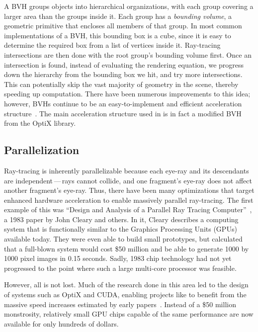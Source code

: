 A BVH groups objects into hierarchical organizations, with each group covering a larger area than the groups inside it.
Each group has a {\it bounding volume}, a geometric primitive that encloses all members of that group.
In most common implementations of a BVH, this bounding box is a cube, since it is easy to determine the required box from a list of vertices inside it.
Ray-tracing intersections are then done with the root group's bounding volume first.
Once an intersection is found, instead of evaluating the rendering equation, we progress down the hierarchy from the bounding box we hit, and try more intersections.
This can potentially skip the vast majority of geometry in the scene, thereby speeding up computation.
There have been numerous improvements to this idea; however, BVHs continue to be an easy-to-implement and efficient acceleration structure~\cite{prunier2017bvh}.
The main acceleration structure used in \name{} is in fact a modified BVH from the OptiX library.

\subsection{Parallelization}
\label{ch:relatedwork:discovery:parallelization}

Ray-tracing is inherently parallelizable because each eye-ray and its descendants are independent\,---\,rays cannot collide, and one fragment's eye-ray does not affect another fragment's eye-ray.
Thus, there have been many optimizations that target enhanced hardware acceleration to enable massively parallel ray-tracing.
The first example of this was ``Design and Analysis of a Parallel Ray Tracing Computer''~\cite{cleary1983design}, a 1983 paper by John Cleary and others.
In it, Cleary describes a computing system that is functionally similar to the Graphics Processing Units (GPUs) available today.
They were even able to build small prototypes, but calculated that a full-blown system would cost \$50 million and be able to generate 1000 by 1000 pixel images in 0.15 seconds.
Sadly, 1983 chip technology had not yet progressed to the point where such a large multi-core processor was feasible.

However, all is not lost.
Much of the research done in this area led to the design of systems such as OptiX and CUDA, enabling projects like \name{} to benefit from the massive speed increases estimated by early papers~\cite{parker2010optix, nvidia2011cuda, whitted2018explains}.
Instead of a \$50 million monstrosity, relatively small GPU chips capable of the same performance are now available for only hundreds of dollars.

